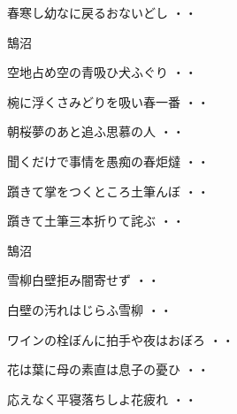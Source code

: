 \begin{shiika}春寒し幼なに戻るおないどし
\hfill{・・}\end{shiika}
\vspace{0.4cm}
鵠沼
\begin{shiika}空地占め空の青吸ひ犬ふぐり
\hfill{・・}\end{shiika}
\begin{shiika}椀に浮くさみどりを吸い春一番
\hfill{・・}\end{shiika}
\begin{shiika}朝桜夢のあと追ふ思慕の人
\hfill{・・}\end{shiika}
\vspace{0.4cm}
\begin{shiika}聞くだけで事情を愚痴の春炬燵
\hfill{・・}\end{shiika}
\begin{shiika}躓きて掌をつくところ土筆んぼ
\hfill{・・}\end{shiika}
\begin{shiika}躓きて土筆三本折りて詫ぶ
\hfill{・・}\end{shiika}
\vspace{0.4cm}
鵠沼
\begin{shiika}雪柳白壁拒み闇寄せず
\hfill{・・}\end{shiika}
\vspace{0.4cm}
\begin{shiika}白壁の汚れはじらふ雪柳
\hfill{・・}\end{shiika}
\vspace{0.4cm}
\begin{shiika}ワインの栓ぼんに拍手や夜はおぼろ
\hfill{・・}\end{shiika}
\vspace{0.4cm}
\begin{shiika}花は葉に母の素直は息子の憂ひ
\hfill{・・}\end{shiika}
\vspace{0.4cm}
\begin{shiika}応えなく平寝落ちしよ花疲れ
\hfill{・・}\end{shiika}
\vspace{0.4cm}

